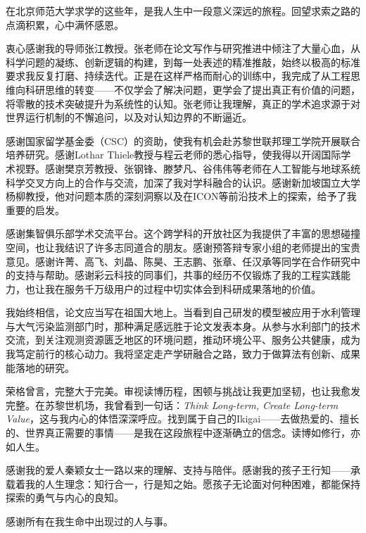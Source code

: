 
\begin{acknowledgements}

  在北京师范大学求学的这些年，是我人生中一段意义深远的旅程。回望求索之路的点滴积累，心中满怀感恩。

  衷心感谢我的导师张江教授。张老师在论文写作与研究推进中倾注了大量心血，从科学问题的凝练、创新逻辑的构建，到每一处表述的精准推敲，始终以极高的标准要求我反复打磨、持续迭代。正是在这样严格而耐心的训练中，我完成了从工程思维向科研思维的转变——不仅学会了解决问题，更学会了提出真正有价值的问题，将零散的技术突破提升为系统性的认知。张老师让我理解，真正的学术追求源于对世界运行机制的不懈追问，以及对认知边界的不断逼近。

  感谢国家留学基金委（CSC）的资助，使我有机会赴苏黎世联邦理工学院开展联合培养研究。感谢Lothar Thiele教授与程云老师的悉心指导，使我得以开阔国际学术视野。感谢樊京芳教授、张钢锋、滕梦凡、谷伟伟等老师在人工智能与地球系统科学交叉方向上的合作与交流，加深了我对学科融合的认识。感谢新加坡国立大学杨柳教授，他对问题本质的深刻洞察以及在ICON等前沿技术上的探索，给予了我重要的启发。

  感谢集智俱乐部学术交流平台。这个跨学科的开放社区为我提供了丰富的思想碰撞空间，也让我结识了许多志同道合的朋友。感谢预答辩专家小组的老师提出的宝贵意见。感谢许菁、高飞、刘晶、陈昊、王志鹏、张章、任汉承等同学在合作研究中的支持与帮助。感谢彩云科技的同事们，共事的经历不仅锻炼了我的工程实践能力，也让我在服务千万级用户的过程中切实体会到科研成果落地的价值。

  我始终相信，论文应当写在祖国大地上。当看到自己研发的模型被应用于水利管理与大气污染监测部门时，那种满足感远胜于论文发表本身。从参与水利部门的技术交流，到关注观测资源匮乏地区的环境问题，推动环境公平、服务公共健康，成为我笃定前行的核心动力。我将坚定走产学研融合之路，致力于做算法有创新、成果能落地的研究。

  荣格曾言，完整大于完美。审视读博历程，困顿与挑战让我更加坚韧，也让我愈发完整。在苏黎世机场，我曾看到一句话：\emph{Think Long-term, Create Long-term Value}，这与我内心的体悟深深呼应。找到属于自己的Ikigai——去做热爱的、擅长的、世界真正需要的事情——是我在这段旅程中逐渐确立的信念。读博如修行，亦如人生。

  感谢我的爱人秦颖女士一路以来的理解、支持与陪伴。感谢我的孩子王行知——承载着我的人生理念：知行合一，行是知之始。愿孩子无论面对何种困难，都能保持探索的勇气与内心的良知。

  感谢所有在我生命中出现过的人与事。

\end{acknowledgements}